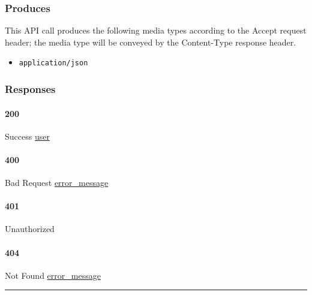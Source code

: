 \hypertarget{produces-80}{%
\subsubsection{Produces}\label{produces-80}}

This API call produces the following media types according to the
{Accept} request header; the media type will be conveyed by the
{Content-Type} response header.

\begin{itemize}
\tightlist
\item
  \texttt{application/json}
\end{itemize}

\hypertarget{responses-82}{%
\subsubsection{Responses}\label{responses-82}}

\hypertarget{section-266}{%
\paragraph{200}\label{section-266}}

Success \protect\hyperlink{user}{user}

\hypertarget{section-267}{%
\paragraph{400}\label{section-267}}

Bad Request \protect\hyperlink{error_message}{error\_message}

\hypertarget{section-268}{%
\paragraph{401}\label{section-268}}

Unauthorized \protect\hyperlink{}{}

\hypertarget{section-269}{%
\paragraph{404}\label{section-269}}

Not Found \protect\hyperlink{error_message}{error\_message}

\begin{center}\rule{0.5\linewidth}{\linethickness}\end{center}

\protect\hypertarget{apiUserUserPut}{}{}

